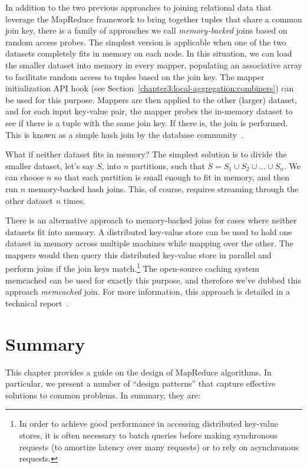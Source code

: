 In addition to the two previous approaches to joining relational data
that leverage the MapReduce framework to bring together tuples that
share a common join key, there is a family of approaches we call
\emph{memory-backed} joins based on random access probes.  The
simplest version is applicable when one of the two datasets completely
fits in memory on each node.  In this situation, we can load the
smaller dataset into memory in every mapper, populating an associative
array to facilitate random access to tuples based on the join key.
The mapper initialization API hook (see
Section~\ref{chapter3:local-aggregation:combiners}) can be used for
this purpose.  Mappers are then applied to the other (larger) dataset,
and for each input key-value pair, the mapper probes the in-memory
dataset to see if there is a tuple with the same join key.  If there
is, the join is performed.  This is known as a simple hash join by the
database community~\cite{DeWitt_etal_1984}.

What if neither dataset fits in memory?  The simplest solution is to
divide the smaller dataset, let's say $S$, into $n$ partitions, such
that $S= S_1 \cup S_2 \cup \ldots \cup S_n$.  We can choose $n$ so
that each partition is small enough to fit in memory, and then run $n$
memory-backed hash joins.  This, of course, requires streaming through
the other dataset $n$ times.

There is an alternative approach to memory-backed joins for cases
where neither datasets fit into memory.  A distributed key-value store
can be used to hold one dataset in memory across multiple machines
while mapping over the other.  The mappers would then query this
distributed key-value store in parallel and perform joins if the join
keys match.\footnote{In order to achieve good performance in accessing
  distributed key-value stores, it is often necessary to batch queries
  before making synchronous requests (to amortize latency over many
  requests) or to rely on asynchronous requests.}  The open-source
caching system memcached can be used for exactly this purpose, and
therefore we've dubbed this approach \emph{memcached} join.  For more
information, this approach is detailed in a technical
report~\cite{Lin_etal_TR2009}.

\section{Summary}

This chapter provides a guide on the design of MapReduce algorithms.
In particular, we present a number of ``design patterns'' that capture
effective solutions to common problems.  In summary, they are:


